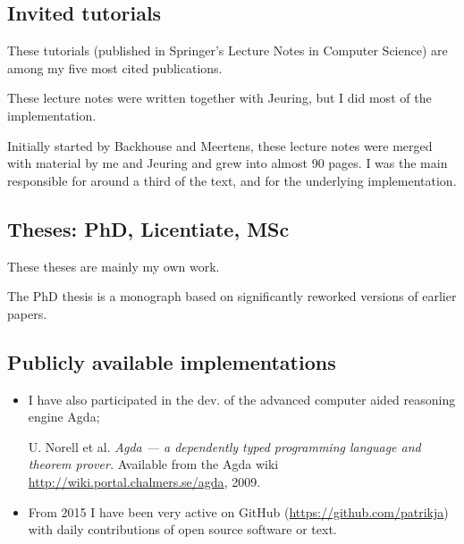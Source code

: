 \subsection{Invited tutorials}
These tutorials (published in Springer's Lecture Notes in Computer
Science) are among my five most cited publications.

\begin{itemize}
%
These lecture notes were written together with Jeuring, but I did most
of the implementation.

%
Initially started by Backhouse and Meertens, these lecture notes were
merged with material by me and Jeuring and grew into almost 90 pages.
%
I was the main responsible for around a third of the text, and for the
underlying implementation.

\end{itemize}
\subsection{Theses: PhD, Licentiate, MSc}
\begin{itemize}
%
These theses are mainly my own work.

%
The PhD thesis is a monograph based on significantly reworked versions
of earlier papers.

\end{itemize}
\subsection{Publicly available implementations}
\begin{itemize}
I implemented this compiler 1997--2001.

We implemented this version together, 2002--2004.


\item
I have also participated in the dev. of the advanced computer aided
reasoning engine Agda;

U. Norell et al. \emph{Agda --- a dependently typed programming language and
theorem prover.} Available from the Agda wiki
\url{http://wiki.portal.chalmers.se/agda}, 2009.

\item From 2015 I have been very active on GitHub
  (\url{https://github.com/patrikja}) with daily contributions of open
  source software or text.

\end{itemize}


